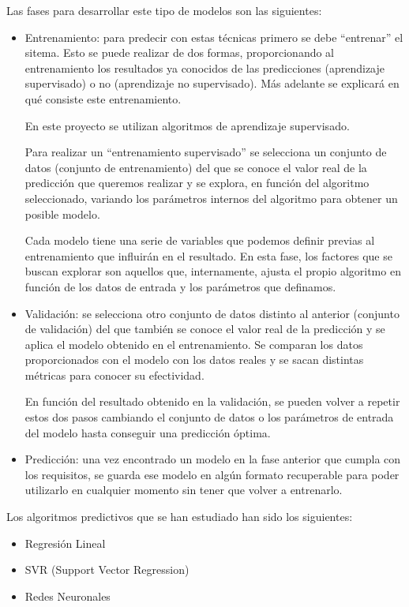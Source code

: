 Las fases para desarrollar este tipo de modelos son las siguientes:
\begin{itemize}
\item Entrenamiento: para predecir con estas técnicas primero se debe ``entrenar'' el sitema. Esto se puede realizar de dos formas, proporcionando al entrenamiento los resultados ya conocidos de las predicciones (aprendizaje supervisado) o no (aprendizaje no supervisado). Más adelante se explicará en qué consiste este entrenamiento.

En este proyecto se utilizan algoritmos de aprendizaje supervisado.

Para realizar un ``entrenamiento supervisado'' se selecciona un conjunto de datos (conjunto de entrenamiento) del que se conoce el valor real de la predicción que queremos realizar y se explora, en función del algoritmo seleccionado, variando los parámetros internos del algoritmo para obtener un posible modelo.

Cada modelo tiene una serie de variables que podemos definir previas al entrenamiento que influirán en el resultado. En esta fase, los factores que se buscan explorar son aquellos que, internamente, ajusta el propio algoritmo en función de los datos de entrada y los parámetros que definamos.

\item Validación: se selecciona otro conjunto de datos distinto al anterior (conjunto de validación) del que también se conoce el valor real de la predicción y se aplica el modelo obtenido en el entrenamiento. Se comparan los datos proporcionados con el modelo con los datos reales y se sacan distintas métricas para conocer su efectividad. 

En función del resultado obtenido en la validación, se pueden volver a repetir estos dos pasos cambiando el conjunto de datos o los parámetros de entrada del modelo hasta conseguir una predicción óptima.

\item Predicción: una vez encontrado un modelo en la fase anterior que cumpla con los requisitos, se guarda ese modelo en algún formato recuperable para poder utilizarlo en cualquier momento sin tener que volver a entrenarlo.
\end{itemize}

Los algoritmos predictivos que se han estudiado han sido los siguientes:

\begin{itemize}
\item Regresión Lineal
\item SVR (Support Vector Regression)
\item Redes Neuronales
\end{itemize}

